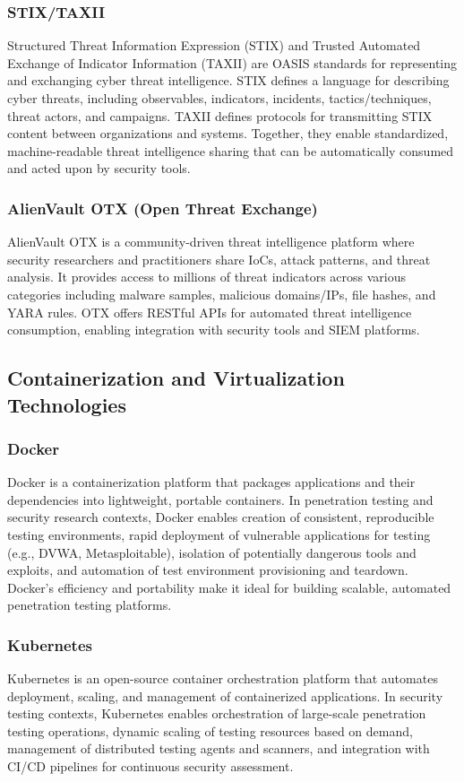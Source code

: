 \subsubsection{STIX/TAXII}
Structured Threat Information Expression (STIX) and Trusted Automated Exchange of Indicator Information (TAXII) are OASIS standards for representing and exchanging cyber threat intelligence. STIX defines a language for describing cyber threats, including observables, indicators, incidents, tactics/techniques, threat actors, and campaigns. TAXII defines protocols for transmitting STIX content between organizations and systems. Together, they enable standardized, machine-readable threat intelligence sharing that can be automatically consumed and acted upon by security tools.

\subsubsection{AlienVault OTX (Open Threat Exchange)}
AlienVault OTX is a community-driven threat intelligence platform where security researchers and practitioners share IoCs, attack patterns, and threat analysis. It provides access to millions of threat indicators across various categories including malware samples, malicious domains/IPs, file hashes, and YARA rules. OTX offers RESTful APIs for automated threat intelligence consumption, enabling integration with security tools and SIEM platforms.

\subsection{Containerization and Virtualization Technologies}

\subsubsection{Docker}
Docker is a containerization platform that packages applications and their dependencies into lightweight, portable containers. In penetration testing and security research contexts, Docker enables creation of consistent, reproducible testing environments, rapid deployment of vulnerable applications for testing (e.g., DVWA, Metasploitable), isolation of potentially dangerous tools and exploits, and automation of test environment provisioning and teardown. Docker's efficiency and portability make it ideal for building scalable, automated penetration testing platforms.

\subsubsection{Kubernetes}
Kubernetes is an open-source container orchestration platform that automates deployment, scaling, and management of containerized applications. In security testing contexts, Kubernetes enables orchestration of large-scale penetration testing operations, dynamic scaling of testing resources based on demand, management of distributed testing agents and scanners, and integration with CI/CD pipelines for continuous security assessment.

